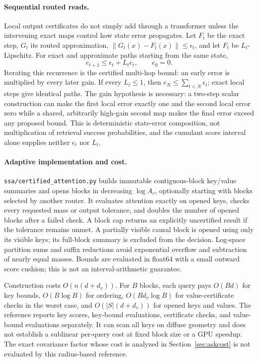 \documentclass[11pt]{article}
\numberwithin{equation}{section}
\begin{document}
\paragraph{Sequential routed reads.} Local output certificates do not simply add through a transformer
unless the intervening exact maps control how state error propagates. Let $F_t$ be the exact step, $G_t$ its
routed approximation, $\lVert G_t(x)-F_t(x)\rVert\le\epsilon_t$, and let $F_t$ be $L_t$-Lipschitz. For exact
and approximate paths starting from the same state,
\begin{equation}\label{eq:sequential-error}
e_{t+1}\le\epsilon_t+L_t e_t,\qquad e_0=0.
\end{equation}
Iterating this recurrence is the certified multi-hop bound: an early error is multiplied by every later
gain. If every $L_t\le1$, then $e_N\le\sum_{t<N}\epsilon_t$; exact local steps give identical paths. The gain
hypothesis is necessary: a two-step scalar construction can make the first local error exactly one and the
second local error zero while a shared, arbitrarily high-gain second map makes the final error exceed any
proposed bound. This is deterministic state-error composition, not multiplication of retrieval success
probabilities, and the cumulant score interval alone supplies neither $\epsilon_t$ nor $L_t$.

\paragraph{Adaptive implementation and cost.}
\texttt{ssa/certified\_attention.py} builds immutable contiguous-block key/value summaries and
opens blocks in decreasing $\log A_c$, optionally starting with blocks selected by another router.
It evaluates attention exactly on opened keys, checks every requested mass or output tolerance,
and doubles the number of opened blocks after a failed check. A block cap returns an explicitly
uncertified result if the tolerance remains unmet. A partially visible causal block is opened
using only its visible keys; its full-block summary is excluded from the decision.
Log-space partition sums and suffix reductions avoid exponential overflow and subtraction of
nearly equal masses. Bounds are evaluated in float64 with a small outward score cushion;
this is not an interval-arithmetic guarantee.

Construction costs $O(n(d+d_v))$. For $B$ blocks, each query pays $O(Bd)$ for key bounds,
$O(B\log B)$ for ordering, $O(Bd_v\log B)$ for value-certificate checks in the worst case,
and $O(|S|(d+d_v))$ for opened keys and values. The reference reports key scores, key-bound
evaluations, certificate checks, and value-bound evaluations separately. It can scan all keys
on diffuse geometry and does not establish a sublinear per-query cost at fixed block size or
a GPU speedup. The exact covariance factor whose cost is analyzed in Section~\ref{sec:askcost}
is not evaluated by this radius-based reference.
\end{document}
